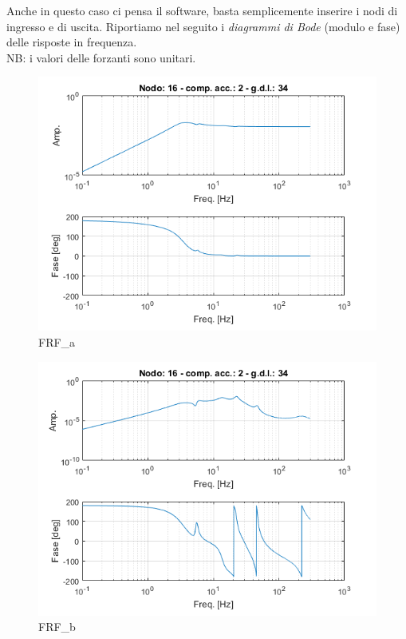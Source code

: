 \documentclass[12pt, a4paper]{article}
\begin{document}
	Anche in questo caso ci pensa il software, basta semplicemente inserire i nodi di ingresso e di uscita. Riportiamo nel seguito i \textit{diagrammi di Bode} (modulo e fase) delle risposte in frequenza.\\
	NB: i valori delle forzanti sono unitari. 
	\begin{figure}[h]
		\centering
		\includegraphics[scale=0.8]{FRF_1}
		\caption{FRF\_a}
	\end{figure}
	\begin{figure}[h]
		\centering
		\includegraphics[scale=0.8]{FRF_2}
		\caption{FRF\_b}
	\end{figure}
\end{document}
